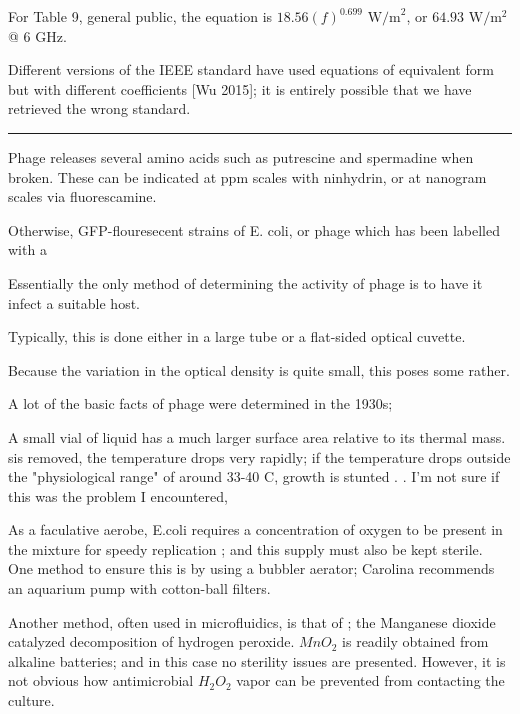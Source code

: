 \documentclass[paper.tex]{subfiles}
\begin{document}
For Table 9, general public, the equation is $18.56 (f)^{0.699} \text{ W/m}^2$, or $64.93 \text{ W}/\text{m}^2$ @ 6 GHz. 

Different versions of the IEEE standard have used equations of equivalent form but with different coefficients [Wu 2015]; it is entirely possible that we have retrieved the wrong standard.

\rule{\linewidth}{0.2pt}





Phage releases several amino acids such as putrescine and spermadine when broken. These can be indicated at ppm scales with ninhydrin, or at nanogram scales via fluorescamine. 

Otherwise, GFP-flouresecent strains of E. coli, or phage which has been labelled with a 






Essentially the only method of determining the activity of phage is to have it infect a suitable host.

Typically, this is done either in a large tube or a flat-sided optical cuvette.

Because the variation in the optical density is quite small, this poses some rather. 

A lot of the basic facts of phage were determined in the 1930s; 

A small vial of liquid has a much larger surface area relative to its thermal mass. sis removed, the temperature drops very rapidly; if the temperature drops outside the "physiological range" of around 33-40 C, growth is stunted \cite{effect2003}. \cite{growth1946}. I'm not sure if this was the problem I encountered, 

As a faculative aerobe, E.coli requires a concentration of oxygen to be present in the mixture for speedy replication \cite{Effect1965}; and this supply must also be kept sterile. One method to ensure this is by using a bubbler aerator; Carolina recommends an aquarium pump with cotton-ball filters. 

Another method, often used in microfluidics\cite{Microfluidic}, is that of \cite{method1951}; the Manganese dioxide catalyzed decomposition of hydrogen peroxide. $MnO_2$ is readily obtained from alkaline batteries; and in this case no sterility issues are presented. However, it is not obvious how antimicrobial $H_2O_2$ vapor can be prevented from contacting the culture.
\end{document}
